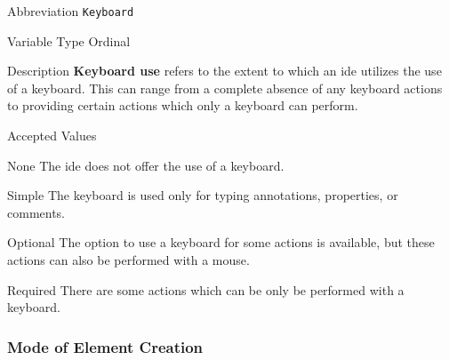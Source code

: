 \begin{AlignedDesc}
  \item[Abbreviation] \texttt{Keyboard}

  \item[Variable Type] Ordinal

  \item[Description] \textbf{Keyboard use} refers to the extent to which an
  \ac{ide} utilizes the use of a keyboard.  This can range from a complete
  absence of any keyboard actions to providing certain actions which only a
  keyboard can perform.

  \item[Accepted Values]

  \begin{AlignedDesc}
    \item[None] The \ac{ide} does not offer the use of a keyboard.
    \item[Simple] The keyboard is used only for typing annotations,
      properties, or comments.
    \item[Optional] The option to use a keyboard for some actions is
    available, but these actions can also be performed with a mouse.
    \item[Required] There are some actions which can be only be performed
    with a keyboard.
  \end{AlignedDesc}

\end{AlignedDesc}

\subsubsection{Mode of Element Creation}
\label{subsec:mode}

